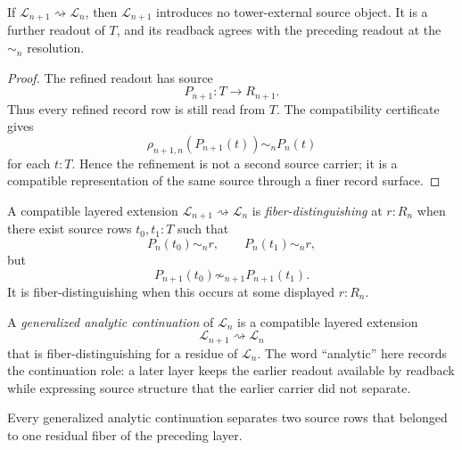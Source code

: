 \begin{theorem}
\label{thm:layered-extension-preserves-source-carrier}
If $\mathcal L_{n+1}\rightsquigarrow\mathcal L_n$, then
$\mathcal L_{n+1}$ introduces no tower-external source object. It is a
further readout of $T$, and its readback agrees with the preceding
readout at the $\sim_n$ resolution.
\end{theorem}

\begin{proof}
The refined readout has source
$$
P_{n+1}:T\to R_{n+1}.
$$
Thus every refined record row is still read from $T$. The compatibility
certificate gives
$$
\rho_{n+1,n}(P_{n+1}(t))\sim_n P_n(t)
$$
for each $t:T$. Hence the refinement is not a second source carrier; it
is a compatible representation of the same source through a finer record
surface.
\end{proof}

\begin{definition}
\label{def:fiber-distinguishing-extension}
A compatible layered extension
$\mathcal L_{n+1}\rightsquigarrow\mathcal L_n$ is
\emph{fiber-distinguishing} at $r:R_n$ when there exist source rows
$t_0,t_1:T$ such that
$$
P_n(t_0)\sim_n r,\qquad
P_n(t_1)\sim_n r,
$$
but
$$
P_{n+1}(t_0)\not\sim_{n+1}P_{n+1}(t_1).
$$
It is fiber-distinguishing when this occurs at some displayed
$r:R_n$.
\end{definition}

\begin{definition}
\label{def:generalized-analytic-continuation}
A \emph{generalized analytic continuation} of $\mathcal L_n$ is a
compatible layered extension
$$
\mathcal L_{n+1}\rightsquigarrow\mathcal L_n
$$
that is fiber-distinguishing for a residue of $\mathcal L_n$. The word
``analytic'' here records the continuation role: a later layer keeps the
earlier readout available by readback while expressing source structure
that the earlier carrier did not separate.
\end{definition}

\begin{theorem}
\label{thm:generalized-continuation-residual-separation}
Every generalized analytic continuation separates two source rows that
belonged to one residual fiber of the preceding layer.
\end{theorem}

